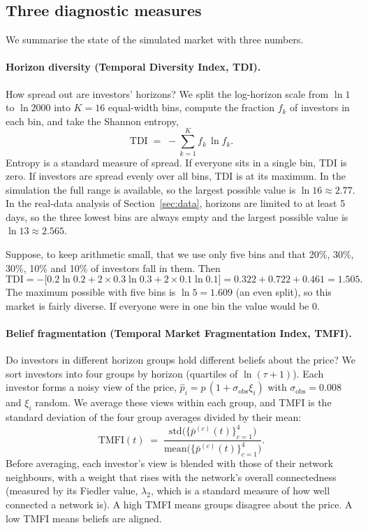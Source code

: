 \subsection{Three diagnostic measures}

We summarise the state of the simulated market with three numbers.

\paragraph{Horizon diversity (Temporal Diversity Index, TDI).} How spread out are investors' horizons? We split the log-horizon scale from $\ln 1$ to $\ln 2000$ into $K=16$ equal-width bins, compute the fraction $f_k$ of investors in each bin, and take the Shannon entropy,
\begin{equation}
\mathrm{TDI} \;=\; -\sum_{k=1}^{K} f_k\,\ln f_k .
\label{eq:tdi}
\end{equation}
Entropy is a standard measure of spread. If everyone sits in a single bin, TDI is zero. If investors are spread evenly over all bins, TDI is at its maximum. In the simulation the full range is available, so the largest possible value is $\ln 16\approx 2.77$. In the real-data analysis of Section~\ref{sec:data}, horizons are limited to at least 5 days, so the three lowest bins are always empty and the largest possible value is $\ln 13\approx 2.565$.

\begin{example}
Suppose, to keep arithmetic small, that we use only five bins and that 20\%, 30\%, 30\%, 10\% and 10\% of investors fall in them. Then
\[
\mathrm{TDI} = -\big[0.2\ln 0.2 + 2\times 0.3\ln 0.3 + 2\times 0.1\ln 0.1\big]
= 0.322 + 0.722 + 0.461 = 1.505 .
\]
The maximum possible with five bins is $\ln 5 = 1.609$ (an even split), so this market is fairly diverse. If everyone were in one bin the value would be $0$.
\end{example}

\paragraph{Belief fragmentation (Temporal Market Fragmentation Index, TMFI).} Do investors in different horizon groups hold different beliefs about the price? We sort investors into four groups by horizon (quartiles of $\ln(\tau+1)$). Each investor forms a noisy view of the price, $\hat p_i = p\,(1+\sigma_{\mathrm{obs}}\xi_i)$ with $\sigma_{\mathrm{obs}}=0.008$ and $\xi_i$ random. We average these views within each group, and TMFI is the standard deviation of the four group averages divided by their mean:
\begin{equation}
\mathrm{TMFI}(t) \;=\; \frac{\mathrm{std}\big(\{\bar p^{(c)}(t)\}_{c=1}^{4}\big)}{\mathrm{mean}\big(\{\bar p^{(c)}(t)\}_{c=1}^{4}\big)} .
\label{eq:tmfi}
\end{equation}
Before averaging, each investor's view is blended with those of their network neighbours, with a weight that rises with the network's overall connectedness (measured by its Fiedler value, $\lambda_2$, which is a standard measure of how well connected a network is). A high TMFI means groups disagree about the price. A low TMFI means beliefs are aligned.

